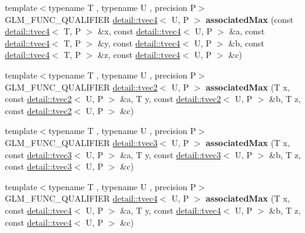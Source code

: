 \begin{DoxyCompactItemize}
\item 
{\footnotesize template$<$typename T , typename U , precision P$>$ }\\G\+L\+M\+\_\+\+F\+U\+N\+C\+\_\+\+Q\+U\+A\+L\+I\+F\+I\+ER \hyperlink{structglm_1_1detail_1_1tvec4}{detail\+::tvec4}$<$ U, P $>$ {\bfseries associated\+Max} (const \hyperlink{structglm_1_1detail_1_1tvec4}{detail\+::tvec4}$<$ T, P $>$ \&x, const \hyperlink{structglm_1_1detail_1_1tvec4}{detail\+::tvec4}$<$ U, P $>$ \&a, const \hyperlink{structglm_1_1detail_1_1tvec4}{detail\+::tvec4}$<$ T, P $>$ \&y, const \hyperlink{structglm_1_1detail_1_1tvec4}{detail\+::tvec4}$<$ U, P $>$ \&b, const \hyperlink{structglm_1_1detail_1_1tvec4}{detail\+::tvec4}$<$ T, P $>$ \&z, const \hyperlink{structglm_1_1detail_1_1tvec4}{detail\+::tvec4}$<$ U, P $>$ \&c)\hypertarget{namespaceglm_afdf990bf8674c1e728c5664e22a52408}{}\label{namespaceglm_afdf990bf8674c1e728c5664e22a52408}

\item 
{\footnotesize template$<$typename T , typename U , precision P$>$ }\\G\+L\+M\+\_\+\+F\+U\+N\+C\+\_\+\+Q\+U\+A\+L\+I\+F\+I\+ER \hyperlink{structglm_1_1detail_1_1tvec2}{detail\+::tvec2}$<$ U, P $>$ {\bfseries associated\+Max} (T x, const \hyperlink{structglm_1_1detail_1_1tvec2}{detail\+::tvec2}$<$ U, P $>$ \&a, T y, const \hyperlink{structglm_1_1detail_1_1tvec2}{detail\+::tvec2}$<$ U, P $>$ \&b, T z, const \hyperlink{structglm_1_1detail_1_1tvec2}{detail\+::tvec2}$<$ U, P $>$ \&c)\hypertarget{namespaceglm_a466c6dd94844a19306e9ee8a2f9eee2f}{}\label{namespaceglm_a466c6dd94844a19306e9ee8a2f9eee2f}

\item 
{\footnotesize template$<$typename T , typename U , precision P$>$ }\\G\+L\+M\+\_\+\+F\+U\+N\+C\+\_\+\+Q\+U\+A\+L\+I\+F\+I\+ER \hyperlink{structglm_1_1detail_1_1tvec3}{detail\+::tvec3}$<$ U, P $>$ {\bfseries associated\+Max} (T x, const \hyperlink{structglm_1_1detail_1_1tvec3}{detail\+::tvec3}$<$ U, P $>$ \&a, T y, const \hyperlink{structglm_1_1detail_1_1tvec3}{detail\+::tvec3}$<$ U, P $>$ \&b, T z, const \hyperlink{structglm_1_1detail_1_1tvec3}{detail\+::tvec3}$<$ U, P $>$ \&c)\hypertarget{namespaceglm_a3921c9a8740abd10014acacb21d1822b}{}\label{namespaceglm_a3921c9a8740abd10014acacb21d1822b}

\item 
{\footnotesize template$<$typename T , typename U , precision P$>$ }\\G\+L\+M\+\_\+\+F\+U\+N\+C\+\_\+\+Q\+U\+A\+L\+I\+F\+I\+ER \hyperlink{structglm_1_1detail_1_1tvec4}{detail\+::tvec4}$<$ U, P $>$ {\bfseries associated\+Max} (T x, const \hyperlink{structglm_1_1detail_1_1tvec4}{detail\+::tvec4}$<$ U, P $>$ \&a, T y, const \hyperlink{structglm_1_1detail_1_1tvec4}{detail\+::tvec4}$<$ U, P $>$ \&b, T z, const \hyperlink{structglm_1_1detail_1_1tvec4}{detail\+::tvec4}$<$ U, P $>$ \&c)\hypertarget{namespaceglm_a3c336bee3c720fd04904466779376d20}{}\label{namespaceglm_a3c336bee3c720fd04904466779376d20}


\end{DoxyCompactItemize}
